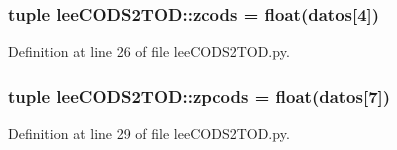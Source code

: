 \subsubsection[{zcods}]{\setlength{\rightskip}{0pt plus 5cm}tuple {\bf lee\-C\-O\-D\-S2\-T\-O\-D\-::zcods} = float({\bf datos}[4])}\label{namespacelee_c_o_d_s2_t_o_d_a87d5152953643aa2d84c9a4b6c1671fd}


\-Definition at line 26 of file lee\-C\-O\-D\-S2\-T\-O\-D.\-py.

\subsubsection[{zpcods}]{\setlength{\rightskip}{0pt plus 5cm}tuple {\bf lee\-C\-O\-D\-S2\-T\-O\-D\-::zpcods} = float({\bf datos}[7])}\label{namespacelee_c_o_d_s2_t_o_d_acc6dd5aece84a1663e0bc18c5ef9ff58}


\-Definition at line 29 of file lee\-C\-O\-D\-S2\-T\-O\-D.\-py.

